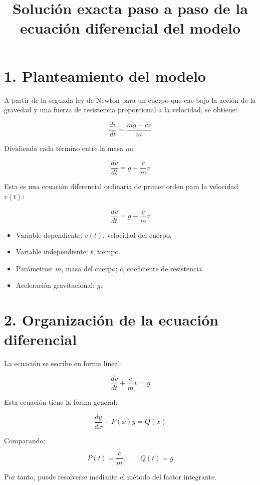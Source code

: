 \documentclass[12pt,letterpaper]{article}
\title{Solución exacta paso a paso de la ecuación diferencial del modelo}
\author{}
\date{}
\begin{document}
\maketitle

\section*{1. Planteamiento del modelo}

A partir de la segunda ley de Newton para un cuerpo que cae bajo la acción de la gravedad y una fuerza de resistencia proporcional a la velocidad, se obtiene:

\[
\frac{dv}{dt}=\frac{mg-cv}{m}
\]

Dividiendo cada término entre la masa \(m\):

\[
\frac{dv}{dt}=g-\frac{c}{m}v
\]

Esta es una ecuación diferencial ordinaria de primer orden para la velocidad \(v(t)\):

\[
\boxed{\frac{dv}{dt}=g-\frac{c}{m}v}
\]

\begin{tcolorbox}[colback=blue!4,colframe=blue!60!black,title=Datos del modelo]
\begin{itemize}[leftmargin=*]
    \item Variable dependiente: \(v(t)\), velocidad del cuerpo.
    \item Variable independiente: \(t\), tiempo.
    \item Parámetros: \(m\), masa del cuerpo; \(c\), coeficiente de resistencia.
    \item Aceleración gravitacional: \(g\).
\end{itemize}
\end{tcolorbox}

\section*{2. Organización de la ecuación diferencial}

La ecuación se escribe en forma lineal:

\[
\frac{dv}{dt}+\frac{c}{m}v=g
\]

Esta ecuación tiene la forma general:

\[
\frac{dy}{dx}+P(x)y=Q(x)
\]

Comparando:

\[
P(t)=\frac{c}{m}, \qquad Q(t)=g
\]

Por tanto, puede resolverse mediante el método del factor integrante.
\end{document}
